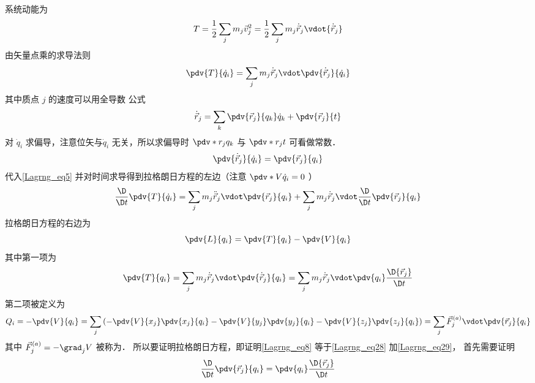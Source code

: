 系统动能为
\begin{equation}
T = \frac{1}{2}\sum\limits_j {{m_j}{{\vec v_j}^2}}  = \frac{1}{2}\sum\limits_j {m_j}{{\dot{\vec r}}_j} \vdot {{\dot {\vec r}}_j}
\end{equation}
由矢量点乘的求导法则
\begin{equation}\label{Lagrng_eq5}
\pdv{T}{\dot q_i} = \sum\limits_j {{m_j}{{\dot {\vec r}}_j} \vdot \pdv{\dot {\vec r}_j}{\dot q_i}}
\end{equation}
其中质点 $j$ 的速度可以用全导数 公式
\begin{equation}
{{\dot {\vec r}}_j} = \sum\limits_k {\pdv{\vec r_j}{q_k} \dot q_k}  + \pdv{\vec r_j}{t}
\end{equation}
对 $\dot q_i$ 求偏导，注意位矢与$\dot q_i$ 无关，所以求偏导时 $\pdv*{r_j}{q_k}$ 与 $\pdv*{r_j}{t}$ 可看做常数．
\begin{equation}\label{Lagrng_eq27}
\pdv{\dot {\vec r}_j}{\dot q_i} = \pdv{\vec r_j}{q_i}
\end{equation}
代入\autoref{Lagrng_eq5} 并对时间求导得到拉格朗日方程的左边（注意 $\pdv*{V}{\dot q_i} = 0$ ）
\begin{equation}\label{Lagrng_eq8}
\frac{\D}{\D t}\pdv{T}{\dot q_i} = \sum\limits_j {{m_j}{{\ddot {\vec r}}_j} \vdot \pdv{\vec r_j}{q_i}}  + \sum\limits_j {{m_j}{{\dot {\vec r}}_j} \vdot \frac{\D}{\D t} \pdv{\vec r_j}{q_i}} 
\end{equation}
拉格朗日方程的右边为
\begin{equation}\label{Lagrng_eq9}
\pdv{L}{q_i} = \pdv{T}{q_i} - \pdv{V}{q_i}
\end{equation}
其中第一项为
\begin{equation}\label{Lagrng_eq28}
\pdv{T}{q_i} = \sum\limits_j {{m_j}{{\dot {\vec r}}_j} \vdot \pdv{\dot {\vec r}_j}{q_i}} = \sum\limits_j {{m_j}{{\dot {\vec r}}_j} \vdot \pdv{q_i} \frac{\D{{\vec r}_j}}{\D t}}
\end{equation}
第二项被定义为
\begin{equation}\label{Lagrng_eq29}
Q_i = - \pdv{V}{q_i} = \sum\limits_j {\left( { - \pdv{V}{x_j} \pdv{x_j}{q_i} - \pdv{V}{y_j}\pdv{y_j}{q_i} - \pdv{V}{z_j} \pdv{z_j}{q_i}} \right)}  = \sum\limits_j {{{\vec F}_j^{(a)}} \vdot \pdv{\vec r_j}{q_i}}  
\end{equation}
其中 ${\vec F}_j^{(a)} = - {\grad_j}V$ 被称为．%
所以要证明拉格朗日方程，即证明\autoref{Lagrng_eq8} 等于\autoref{Lagrng_eq28} 加\autoref{Lagrng_eq29}， 首先需要证明
\begin{equation}
\frac{\D}{\D t} \pdv{\vec r_j}{q_i} = \pdv{q_i} \frac{\D{{\vec r}_j}}{\D t}
\end{equation}
